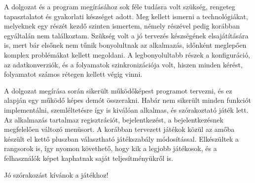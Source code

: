 


A dolgozat és a program megírásához sok féle tudásra volt szükség, rengeteg tapasztalatot és gyakorlati készséget adott. Meg kellett ismerni a technológiákat, melyeknek egy részét kezdő szinten ismertem, némely részével pedig korábban egyáltalán nem találkoztam. Szükség volt a jó tervezés készségének elsajátítására is, mert bár elsőnek nem tűnik bonyolultnak az alkalmazás, időnként meglepően komplex problémákat kellett megoldani. A legbonyolultabb részek a konfiguráció, az adatkonverziók, és a folyamatok szinkronizációja volt, hiszen minden kérést, folyamatot számos rétegen kellett végig vinni. 

A dolgozat megírása során sikerült működőképest programot tervezni, és ez alapján egy működő képes demót összerakni. Habár nem sikerült minden funkciót implementálni, szemléltetésre így is kiválóan alkalmas, és szórakoztató játék lett.
Az alkalmazás tartalmaz regisztrációt, bejelentkezést, a bejelentkezésnek megfelelően változó menüsort. A korábban tervezett játékok közül az amőba készült el kettő pluszban választható játékszabály módosítással. Elkészültek a rangsorok is, így nyomon követhető, hogy kik a legjobb játékosok, és a felhasználók képet kaphatnak saját teljesítményükről is.

Jó szórakozást kívánok a játékhoz!





